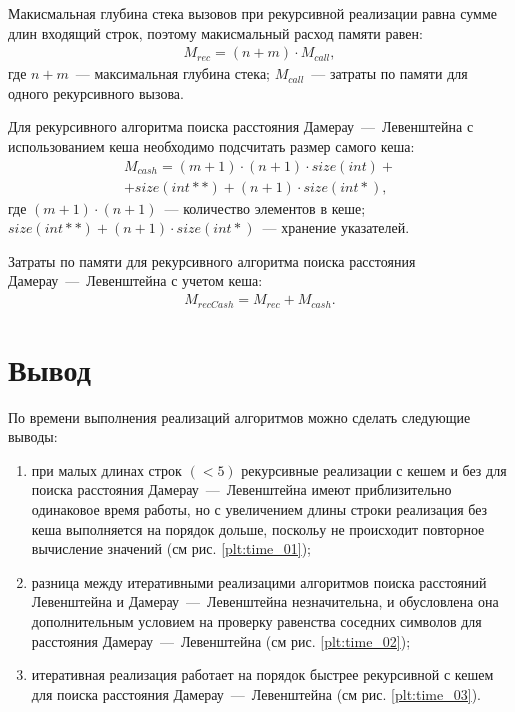 Макисмальная глубина стека вызовов при рекурсивной реализации равна сумме длин входящий строк, поэтому макисмальный расход памяти равен:
\begin{equation}
	\begin{aligned}
		M_{rec} = (n + m) \cdot M_{call},
	\end{aligned}
\end{equation}
где $n + m$~--- максимальная глубина стека;
\newline $M_{call}$~--- затраты по памяти для одного рекурсивного вызова.

Для рекурсивного алгоритма поиска расстояния Дамерау~---~Левенштейна с использованием кеша необходимо подсчитать размер самого кеша:
\begin{multline}
	M_{cash} = (m + 1) \cdot (n + 1) \cdot size(int) + \\ + size(int **) + (n + 1) \cdot size(int *),
\end{multline}
где $(m + 1) \cdot (n + 1)$~--- количество элементов в кеше;
\newline $size(int **) + (n + 1) \cdot size(int *)$~--- хранение указателей.

Затраты по памяти для рекурсивного алгоритма поиска расстояния Дамерау~---~Левенштейна с учетом кеша: 
\begin{equation}
	\label{}
	\begin{aligned}
		M_{recCash} = M_{rec} + M_{cash}.
	\end{aligned}
\end{equation}

\section{Вывод}

По времени выполнения реализаций алгоритмов можно сделать следующие выводы:
\begin{enumerate}
	\item при малых длинах строк $(< 5)$ рекурсивные реализации с кешем и без для поиска расстояния Дамерау~---~Левенштейна имеют приблизительно одинаковое время работы, 
	но с увеличением длины строки реализация без кеша выполняется на порядок дольше, поскольу не происходит повторное вычисление значений (см рис. \ref{plt:time_01});
	\item разница между итеративными реализацими алгоритмов поиска расстояний Левенштейна и Дамерау~---~Левенштейна незначительна, и обусловлена она
	дополнительным условием на проверку равенства соседних символов для расстояния Дамерау~---~Левенштейна (см рис. \ref{plt:time_02});
	\item итеративная реализация работает на порядок быстрее рекурсивной с кешем для поиска расстояния Дамерау~---~Левенштейна (см рис. \ref{plt:time_03}).
\end{enumerate}

